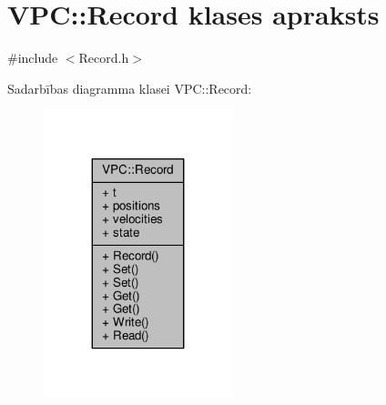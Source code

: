 \hypertarget{class_v_p_c_1_1_record}{}\section{V\+PC\+:\+:Record klases apraksts}
\label{class_v_p_c_1_1_record}


{\ttfamily \#include $<$Record.\+h$>$}



Sadarbības diagramma klasei V\+PC\+:\+:Record\+:
\nopagebreak
\begin{figure}[H]
\begin{center}
\leavevmode
\includegraphics[width=155pt]{class_v_p_c_1_1_record__coll__graph}
\end{center}
\end{figure}
